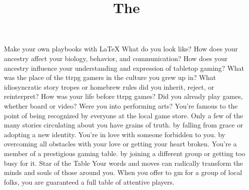 \documentclass[darkmode]{dw2_playbook}
\title{The \playbook}
\begin{document}

\pageOne
  {
      Make your own playbooks with LaTeX
  }
  {
      What do you look like? How does your ancestry affect your biology, behavior, and communication? How does your ancestry influence your understanding and expression of tabletop gaming?
  }
  {
      What was the place of the ttrpg gamers in the culture you grew up in? What idiosyncratic story tropes or homebrew rules did you inherit, reject, or reinterpret?
  }
  {
      How was your life before ttrpg games? Did you already play games, whether board or video?  Were you into performing arts?
  }
  {
        {
          You're famous to the point of being recognized by everyone at the local game store. Only a few of the many stories circulating about you have grains of truth.  by falling from grace or adopting a new identity.
        }
        {
          You're in love with someone forbidden to you.  by overcoming all obstacles with your love or getting your heart broken.
        }
        {
          You're a member of a prestigious gaming table.  by joining a different group or getting too busy for it.
        }
      \diyDrive
  }
  {
  }
  {
      \takemove
          {
            Star of the Table
          }
          {
            Your words and moves can radically transform the minds and souls of those around you. When you offer to gm for a group of local folks, you are guaranteed a full table of attentive players.
          }
  }
  {
  }
\end{document}
